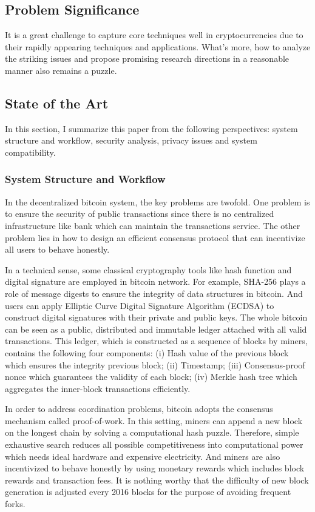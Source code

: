 \documentclass[conference]{IEEEtran}
\begin{document}
\subsection{Problem Significance}
It is a great challenge to capture core techniques well in cryptocurrencies due to their rapidly appearing techniques and applications.
%
What's more, how to analyze the striking issues and propose promising research directions in a reasonable manner also remains a puzzle.


\subsection{State of the Art}
In this section, I summarize this paper from the following perspectives: system structure and workflow, security analysis, privacy issues and system compatibility.

\subsubsection{System Structure and Workflow}
In the decentralized bitcoin system, the key problems are twofold. 
%
One problem is to ensure the security of public transactions since there is no centralized infrastructure like bank which can maintain the transactions service.
%
The other problem lies in how to design an efficient consensus protocol that can incentivize all users to behave honestly.

In a technical sense, some classical cryptography tools like hash function and digital signature are employed in bitcoin network.
%
For example, SHA-256 plays a role of message digests to ensure the integrity of data structures in bitcoin.
%
And users can apply Elliptic Curve Digital Signature Algorithm (ECDSA)\cite{johnson2001elliptic} to construct digital signatures with their private and public keys.
%
The whole bitcoin can be seen as a public, distributed and immutable ledger attached with all valid transactions.
%
This ledger, which is constructed as a sequence of blocks by miners, contains the following four components:
(i) Hash value of the previous block which ensures the integrity previous block; 
(ii) Timestamp; 
(iii) Consensus-proof nonce which guarantees the validity of each block;  
(iv) Merkle hash tree which aggregates the inner-block transactions efficiently.

In order to address coordination problems, bitcoin adopts the consensus mechanism called proof-of-work.
%
In this setting, miners can append a new block on the longest chain by solving a computational hash puzzle.
%
Therefore, simple exhaustive search reduces all possible competitiveness into computational power which needs ideal hardware and expensive electricity.
%
And miners are also incentivized to behave honestly by using monetary rewards which includes block rewards and transaction fees.
%
It is nothing worthy that the difficulty of new block generation is adjusted every 2016 blocks for the purpose of avoiding frequent forks.
\end{document}
